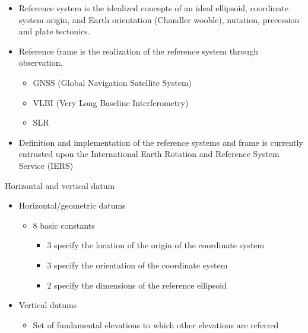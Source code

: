 \documentclass[11pt,dvipsnames,ignorenonframetext,aspectratio=169]{beamer}
\providecommand{\tightlist}{%
  \setlength{\itemsep}{0pt}\setlength{\parskip}{0pt}}
\begin{document}
\begin{frame}{}
\protect\hypertarget{section-1}{}
\begin{itemize}
\tightlist
\item
  Reference system is the idealized concepts of an ideal ellipsoid,
  coordinate system origin, and Earth orientation (Chandler wooble),
  nutation, precession and plate tectonics.
\item
  Reference frame is the realization of the reference system through
  observation.

  \begin{itemize}
  \scriptsize
  \item GNSS (Global Navigation Satellite System)
  \item VLBI (Very Long Baseline Interferometry)
  \item SLR
  \end{itemize}
\item
  Definition and implementation of the reference systems and frame is
  currently entrusted upon the International Earth Rotation and
  Reference System Service (IERS)
\end{itemize}
\end{frame}

\begin{frame}{Horizontal and vertical datum}
\protect\hypertarget{horizontal-and-vertical-datum}{}
\begin{itemize}
\tightlist
\item
  Horizontal/geometric datums

  \begin{itemize}
  \tightlist
  \item
    8 basic constants

    \begin{itemize}
    \tightlist
    \item
      3 specify the location of the origin of the coordinate system
    \item
      3 specify the orientation of the coordinate system
    \item
      2 specify the dimensions of the reference ellipsoid
    \end{itemize}
  \end{itemize}
\item
  Vertical datums

  \begin{itemize}
  \tightlist
  \item
    Set of fundamental elevations to which other elevations are referred
  \end{itemize}
\end{itemize}
\end{frame}
\end{document}
